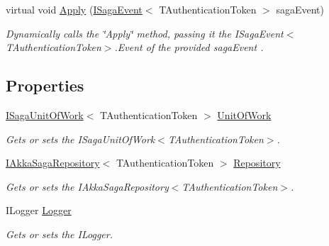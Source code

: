 \begin{DoxyCompactItemize}
virtual void \hyperlink{classCqrs_1_1Akka_1_1Domain_1_1AkkaSaga_a4a12310825f2d2cc5963eee4cc4ed802_a4a12310825f2d2cc5963eee4cc4ed802}{Apply} (\hyperlink{interfaceCqrs_1_1Events_1_1ISagaEvent}{I\+Saga\+Event}$<$ T\+Authentication\+Token $>$ saga\+Event)
\begin{DoxyCompactList}\small\item\em Dynamically calls the \char`\"{}\+Apply\char`\"{} method, passing it the I\+Saga\+Event$<$\+T\+Authentication\+Token$>$.\+Event of the provided {\itshape saga\+Event} . \end{DoxyCompactList}\end{DoxyCompactItemize}
\subsection*{Properties}
\begin{DoxyCompactItemize}
\item 
\hyperlink{interfaceCqrs_1_1Domain_1_1ISagaUnitOfWork}{I\+Saga\+Unit\+Of\+Work}$<$ T\+Authentication\+Token $>$ \hyperlink{classCqrs_1_1Akka_1_1Domain_1_1AkkaSaga_addbf93da18d577da8f8f1e2dba5cafb9_addbf93da18d577da8f8f1e2dba5cafb9}{Unit\+Of\+Work}
\begin{DoxyCompactList}\small\item\em Gets or sets the I\+Saga\+Unit\+Of\+Work$<$\+T\+Authentication\+Token$>$. \end{DoxyCompactList}\item 
\hyperlink{interfaceCqrs_1_1Akka_1_1Domain_1_1IAkkaSagaRepository}{I\+Akka\+Saga\+Repository}$<$ T\+Authentication\+Token $>$ \hyperlink{classCqrs_1_1Akka_1_1Domain_1_1AkkaSaga_a4c0662a1aa78c8de5fa32c71a54cf393_a4c0662a1aa78c8de5fa32c71a54cf393}{Repository}
\begin{DoxyCompactList}\small\item\em Gets or sets the I\+Akka\+Saga\+Repository$<$\+T\+Authentication\+Token$>$. \end{DoxyCompactList}\item 
I\+Logger \hyperlink{classCqrs_1_1Akka_1_1Domain_1_1AkkaSaga_acbb9a6e1cde3e2846270a8fe3f55bc92_acbb9a6e1cde3e2846270a8fe3f55bc92}{Logger}
\begin{DoxyCompactList}\small\item\em Gets or sets the I\+Logger. \end{DoxyCompactList}\item 

\end{DoxyCompactItemize}
